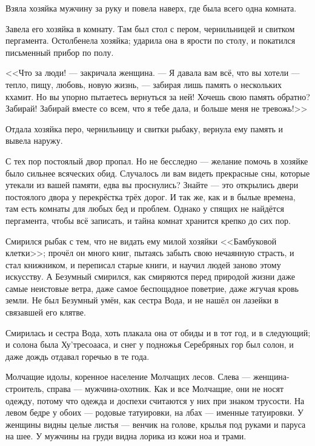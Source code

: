 Взяла хозяйка мужчину за руку и повела наверх, где была всего одна комната.

Завела его хозяйка в комнату.
Там был стол с пером, чернильницей и свитком пергамента.
Остолбенела хозяйка;
ударила она в ярости по столу, и покатился письменный прибор по полу.

<<Что за люди! --- закричала женщина.
--- Я давала вам всё, что вы хотели --- тепло, пищу, любовь, новую жизнь, --- забирая лишь память о нескольких кхамит.
Но вы упорно пытаетесь вернуться за ней!
Хочешь свою память обратно?
Забирай!
Забирай вместе со всем, что я тебе дала, и больше меня не тревожь!>>

Отдала хозяйка перо, чернильницу и свитки рыбаку, вернула ему память и вывела наружу.

С тех пор постоялый двор пропал.
Но не бесследно --- желание помочь в хозяйке было сильнее всяческих обид.
Случалось ли вам видеть прекрасные сны, которые утекали из вашей памяти, едва вы проснулись?
Знайте --- это открылись двери постоялого двора у перекрёстка трёх дорог.
И так же, как и в былые времена, там есть комнаты для любых бед и проблем.
Однако у спящих не найдётся пергамента, чтобы всё записать, и тайна комнат хранится крепко до сих пор.

Смирился рыбак с тем, что не видать ему милой хозяйки <<Бамбуковой клетки>>;
прочёл он много книг, пытаясь забыть свою нечаянную страсть, и стал книжником, и переписал старые книги, и научил людей заново этому искусству.
А Безумный смирился, как смиряются перед природой жизни даже самые неистовые ветра, даже самое беспощадное поветрие, даже жгучая кровь земли.
Не был Безумный умён, как сестра Вода, и не нашёл он лазейки в связавшей его клятве.

Смирилась и сестра Вода, хоть плакала она от обиды и в тот год, и в следующий;
и солона была Ху'тресоааса, и снег у подножья Серебряных гор был солон, и даже дождь отдавал горечью в те года\FM.


\newpage
\thispagestyle{plain}

Молчащие идолы, коренное население Молчащих лесов.
Слева --- женщина-строитель, справа --- мужчина-охотник.
Как и все Молчащие, они не носят одежду, потому что одежда и доспехи считаются у них при знаком трусости.
На левом бедре у обоих --- родовые татуировки, на лбах --- именные татуировки.
У женщины видны целые листья --- венчик на голове, крылья под руками и паруса на шее.
У мужчины на груди видна лорика из кожи ноа и трами.
\newpage

